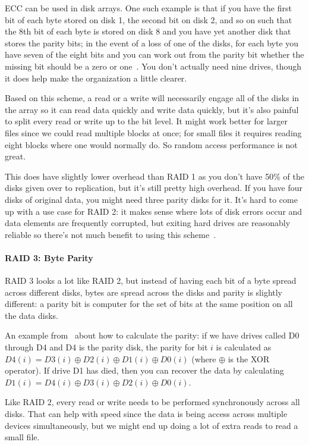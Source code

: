 ECC can be used in disk arrays. One such example is that if you have the first bit of each byte stored on disk 1, the second bit on disk 2, and so on such that the 8th bit of each byte is stored on disk 8 and you have yet another disk that stores the parity bits; in the event of a loss of one of the disks, for each byte you have seven of the eight bits and you can work out from the parity bit whether the missing bit should be a zero or one~\cite{osc}. You don't actually need nine drives, though it does help make the organization a little clearer.

Based on this scheme, a read or a write will necessarily engage all of the disks in the array so it can read data quickly and write data quickly, but it's also painful to split every read or write up to the bit level. It might work better for larger files since we could read multiple blocks at once; for small files it requires reading eight blocks where one would normally do. So random access performance is not great.

This does have slightly lower overhead than RAID 1 as you don't have 50\% of the disks given over to replication, but it's still pretty high overhead. If you have four disks of original data, you might need three parity disks for it. It's hard to come up with a use case for RAID 2: it makes sense where lots of disk errors occur and data elements are frequently corrupted, but exiting hard drives are reasonably reliable so there's not much benefit to using this scheme~\cite{osi}.

\paragraph{RAID 3: Byte Parity}

RAID 3 looks a lot like RAID 2, but instead of having each bit of a byte spread across different disks, bytes are spread across the disks and parity is slightly different: a parity bit is computer for the set of bits at the same position on all the data disks.

An example from~\cite{osi} about how to calculate the parity: if we have drives called D0 through D4 and D4 is the parity disk, the parity for bit $i$ is calculated as $D4(i) = D3(i) \oplus D2(i) \oplus D1(i) \oplus D0(i)$ (where $\oplus$ is the XOR operator). If drive D1 has died, then you can recover the data by calculating $D1(i) = D4(i) \oplus D3(i) \oplus D2(i) \oplus D0(i)$.

Like RAID 2, every read or write needs to be performed synchronously across all disks. That can help with speed since the data is being access across multiple devices simultaneously, but we might end up doing a lot of extra reads to read a small file.

